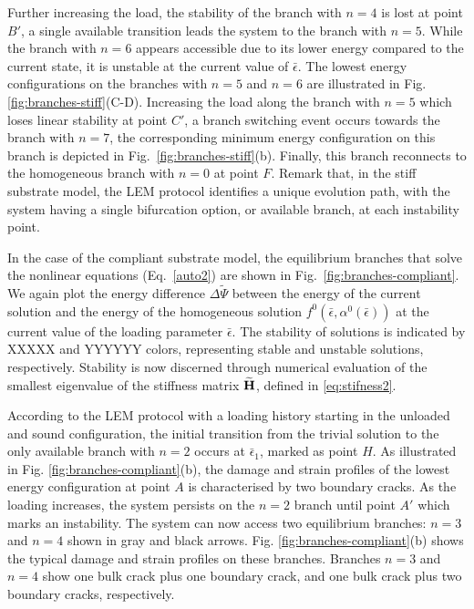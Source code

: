 Further increasing the load, the stability of the branch with $n=4$ is lost at point $B'$, a single available transition leads the system to the branch with $n=5$. While the branch with $n=6$ appears accessible due to its lower energy compared to the current state, it is unstable at the current value of $\bar\epsilon$. The lowest energy configurations on the branches with $n=5$ and $n=6$ are illustrated in Fig. \ref{fig:branches-stiff}(C-D). Increasing the load along the branch with $n=5$ which loses linear stability at point $C'$, a branch switching event occurs towards the branch with $n=7$, the corresponding minimum energy configuration on this branch is depicted in Fig.~\ref{fig:branches-stiff}(b). Finally, this branch reconnects to the homogeneous branch with $n=0$ at point $F$. Remark that, in the stiff substrate model, the LEM protocol identifies a unique evolution path, with the system having a single bifurcation option, or available branch, at each instability point.

In the case of the compliant substrate model, the equilibrium branches that solve the nonlinear equations (Eq.~\ref{auto2}) are shown in Fig.~\ref{fig:branches-compliant}. 
We again plot the energy difference $\Delta \widetilde\Psi$ between the energy of the current solution and the energy of the homogeneous solution $f^0(\bar{\epsilon}, \alpha^0(\bar{\epsilon}))$ at the current value of the loading parameter $\bar\epsilon$. 
The stability of solutions is indicated by XXXXX and YYYYYY colors, representing stable and unstable solutions, respectively. Stability is now discerned through numerical evaluation of the smallest eigenvalue of the stiffness matrix $\widetilde{\mathbf{H}}$, defined in \eqref{eq:stifness2}.

According to the LEM protocol with a loading history starting in the unloaded and sound configuration, the initial transition from the trivial solution to the only available branch with $n=2$ occurs at $\bar \epsilon_1$, marked as point $H$. As illustrated in Fig. \ref{fig:branches-compliant}(b), the damage and strain profiles of the lowest energy configuration at point $A$ is characterised by two boundary cracks. As the loading increases, the system persists on the $n=2$ branch until point $A'$ which marks an instability. The system can now access two equilibrium branches: $n=3$ and $n=4$ shown in gray and black arrows. Fig. \ref{fig:branches-compliant}(b) shows the typical damage and strain profiles on these branches. Branches $n=3$ and $n=4$ show one bulk crack plus one boundary crack, and one bulk crack plus two boundary cracks, respectively. 

